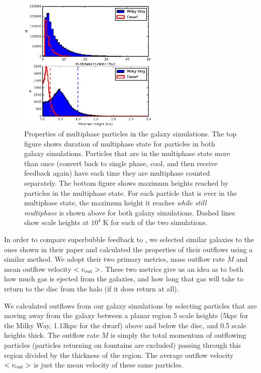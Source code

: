 \begin{figure}
    \includegraphics[width=0.6\textwidth]{figures1/multiphase_properties.eps}
    \caption[Properties of multiphase particles]{Properties of multiphase
    particles in the galaxy simulations.  The top figure shows duration of
    multiphase state for particles in both galaxy simulations.  Particles that
    are in the multiphase state more than once (convert back to single phase,
    cool, and then receive feedback again) have each time they are multiphase
    counted separately. The bottom figure shows maximum heights reached by
    particles in the multiphase state.  For each particle that is ever in the
    multiphase state, the maximum height it reaches {\it while still multiphase}
    is shown above for both galaxy simulations.  Dashed lines show scale heights
    at $10^4\;\mathrm{K}$ for each of the two simulations.}
    \label{multiphase_properties1}
\end{figure}
In order to compare superbubble feedback to \citet{DallaVecchia2012}, we selected
similar galaxies to the ones shown in their paper and calculated the properties
of their outflows using a similar method.  We adopt their two primary metrics,
mass outflow rate $\dot M$ and mean outflow velocity $<v_{\rm out}>$.  These two
metrics give us an idea as to both how much gas is ejected from the galaxies,
and how long that gas will take to return to the disc from the halo (if it does
return at all).

We calculated outflows from our galaxy simulations by selecting particles that
are moving away from the galaxy between a planar region 5 scale heights (5kpc
for the Milky Way, 1.13kpc for the dwarf) above and below the disc, and 0.5
scale heights thick.  The outflow rate $\dot M$ is simply the total momentum of
outflowing particles (particles returning on fountains are excluded) passing
through this region divided by the thickness of the region.  The average outflow
velocity $<v_{\rm out}>$ is just the mean velocity of these same particles.

